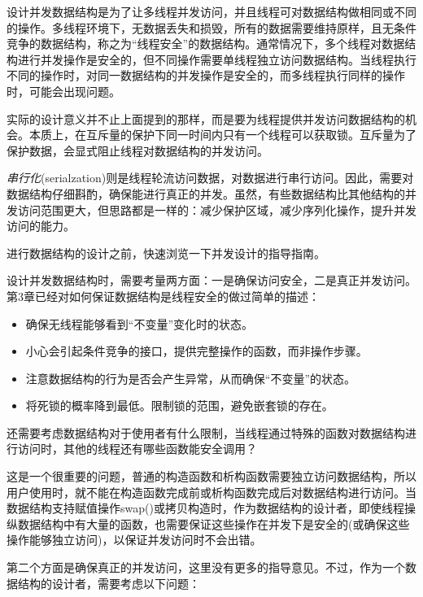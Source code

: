 
设计并发数据结构是为了让多线程并发访问，并且线程可对数据结构做相同或不同的操作。多线程环境下，无数据丢失和损毁，所有的数据需要维持原样，且无条件竞争的数据结构，称之为“线程安全”的数据结构。通常情况下，多个线程对数据结构进行并发操作是安全的，但不同操作需要单线程独立访问数据结构。当线程执行不同的操作时，对同一数据结构的并发操作是安全的，而多线程执行同样的操作时，可能会出现问题。

实际的设计意义并不止上面提到的那样，而是要为线程提供并发访问数据结构的机会。本质上，在互斥量的保护下同一时间内只有一个线程可以获取锁。互斥量为了保护数据，会显式阻止线程对数据结构的并发访问。

\textit{串行化}(serialzation)则是线程轮流访问数据，对数据进行串行访问。因此，需要对数据结构仔细斟酌，确保能进行真正的并发。虽然，有些数据结构比其他结构的并发访问范围更大，但思路都是一样的：减少保护区域，减少序列化操作，提升并发访问的能力。

进行数据结构的设计之前，快速浏览一下并发设计的指导指南。


设计并发数据结构时，需要考量两方面：一是确保访问安全，二是真正并发访问。第3章已经对如何保证数据结构是线程安全的做过简单的描述：

\begin{itemize}
    \item 确保无线程能够看到“不变量”变化时的状态。
    \item 小心会引起条件竞争的接口，提供完整操作的函数，而非操作步骤。
    \item 注意数据结构的行为是否会产生异常，从而确保“不变量”的状态。
    \item 将死锁的概率降到最低。限制锁的范围，避免嵌套锁的存在。
\end{itemize}

还需要考虑数据结构对于使用者有什么限制，当线程通过特殊的函数对数据结构进行访问时，其他的线程还有哪些函数能安全调用？

这是一个很重要的问题，普通的构造函数和析构函数需要独立访问数据结构，所以用户使用时，就不能在构造函数完成前或析构函数完成后对数据结构进行访问。当数据结构支持赋值操作swap()或拷贝构造时，作为数据结构的设计者，即使线程操纵数据结构中有大量的函数，也需要保证这些操作在并发下是安全的(或确保这些操作能够独立访问)，以保证并发访问时不会出错。

第二个方面是确保真正的并发访问，这里没有更多的指导意见。不过，作为一个数据结构的设计者，需要考虑以下问题：

